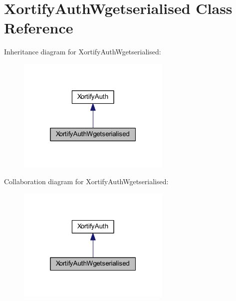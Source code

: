 \hypertarget{class_xortify_auth_wgetserialised}{\section{Xortify\-Auth\-Wgetserialised Class Reference}
\label{class_xortify_auth_wgetserialised}
}


Inheritance diagram for Xortify\-Auth\-Wgetserialised\-:
\nopagebreak
\begin{figure}[H]
\begin{center}
\leavevmode
\includegraphics[width=208pt]{class_xortify_auth_wgetserialised__inherit__graph}
\end{center}
\end{figure}


Collaboration diagram for Xortify\-Auth\-Wgetserialised\-:
\nopagebreak
\begin{figure}[H]
\begin{center}
\leavevmode
\includegraphics[width=208pt]{class_xortify_auth_wgetserialised__coll__graph}
\end{center}
\end{figure}
